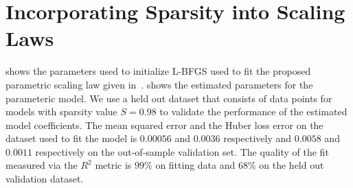 \newpage
\section{Incorporating Sparsity into Scaling Laws}
\label{appendix:scaling_law_sparsity}

 shows the parameters used to initialize L-BFGS used to fit the proposed parametric scaling law given in~.  shows the estimated parameters for the parameteric model. We use a held out dataset that consists of data points for models with sparsity value $S = 0.98$ to validate the performance of the estimated model coefficients. The mean squared error and the Huber loss error on the dataset used to fit the model is $0.00056$ and $ 0.0036$ respectively and $0.0058$ and $0.0011$ respectively on the out-of-sample validation set. The quality of the fit measured via the $R^{2}$ metric is $99\%$ on fitting data and $68\%$ on the held out validation dataset.



